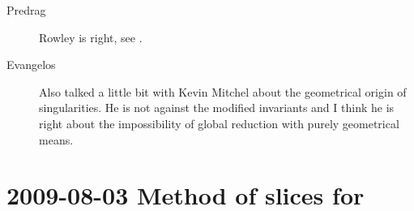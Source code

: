 \begin{description}
\item[Predrag]
Rowley is right, see .

\item[Evangelos]
Also talked a little bit with Kevin Mitchel about the
geometrical origin of singularities. He is not against the
modified invariants and I think he is right about the
impossibility of global reduction with purely geometrical
means.
\end{description}

\section{2009-08-03 Method of slices for \cLf}
\renewcommand{\ssp}{x}
\renewcommand{\vel}{\ensuremath{v}}   %

